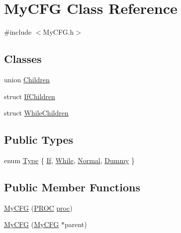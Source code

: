 \hypertarget{class_my_c_f_g}{\section{My\-C\-F\-G Class Reference}
\label{class_my_c_f_g}
}


{\ttfamily \#include $<$My\-C\-F\-G.\-h$>$}

\subsection*{Classes}
\begin{DoxyCompactItemize}
\item 
union \hyperlink{union_my_c_f_g_1_1_children}{Children}
\item 
struct \hyperlink{struct_my_c_f_g_1_1_if_children}{If\-Children}
\item 
struct \hyperlink{struct_my_c_f_g_1_1_while_children}{While\-Children}
\end{DoxyCompactItemize}
\subsection*{Public Types}
\begin{DoxyCompactItemize}
\item 
enum \hyperlink{class_my_c_f_g_ae44c85f707369fa29092e3c696522f20}{Type} \{ \hyperlink{class_my_c_f_g_ae44c85f707369fa29092e3c696522f20a6c8b645167a343d0021972e2ef107b7a}{If}, 
\hyperlink{class_my_c_f_g_ae44c85f707369fa29092e3c696522f20a29d9804b36f327847c1c8dc10fb8c1db}{While}, 
\hyperlink{class_my_c_f_g_ae44c85f707369fa29092e3c696522f20afd74660ae3d5a10c6fa76c2c9107022c}{Normal}, 
\hyperlink{class_my_c_f_g_ae44c85f707369fa29092e3c696522f20a1af74848856a5276074612bb8d7e804d}{Dummy}
 \}
\end{DoxyCompactItemize}
\subsection*{Public Member Functions}
\begin{DoxyCompactItemize}
\item 
\hyperlink{class_my_c_f_g_a5a99ea60e42d9ee48f00aa52407b4af0}{My\-C\-F\-G} (\hyperlink{std_afx_8h_aa07ea1d188c7b45668f1bd82ffd6d87e}{P\-R\-O\-C} \hyperlink{class_my_c_f_g_a4c0a0b3dfef0a445bd0b888a91996e24}{proc})
\item 
\hyperlink{class_my_c_f_g_a2415efb3ee7bb2468cf5a7c2fb5bc3ba}{My\-C\-F\-G} (\hyperlink{class_my_c_f_g}{My\-C\-F\-G} $\ast$parent)
\end{DoxyCompactItemize}
